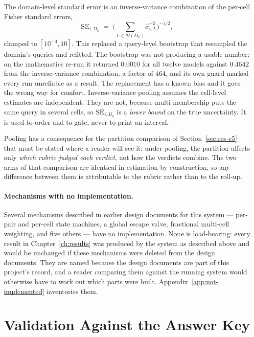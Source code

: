 The domain-level standard error is an inverse-variance combination of
the per-cell Fisher standard errors,
\[
\mathrm{SE}_{i,D_k} \;=\;
\Big(\textstyle\sum_{L \in \mathcal{D}(D_k)} \hat{\sigma}_{i,L}^{-2}\Big)^{-1/2},
\]
clamped to $[10^{-3}, 10]$. This replaced a query-level bootstrap that
resampled the domain's queries and refitted. The bootstrap was not
producing a usable number: on the mathematics re-run it returned
$0.0010$ for all twelve models against $0.4642$ from the
inverse-variance combination, a factor of $464$, and its own guard
marked every run unreliable as a result.
The replacement has a known bias and it goes the wrong way for comfort.
Inverse-variance pooling assumes the cell-level estimates are
independent. They are not, because multi-membership puts the same query
in several cells, so $\mathrm{SE}_{i,D_k}$ is a \emph{lower bound} on
the true uncertainty. It is used to order and to gate, never to print
an interval.

Pooling has a consequence for the partition comparison of
Section~\ref{sec:res-c5} that must be stated where a reader will see
it: under pooling, the partition affects only \emph{which rubric judged
each verdict}, not how the verdicts combine. The two arms of that
comparison are identical in estimation by construction, so any
difference between them is attributable to the rubric rather than to
the roll-up.

\paragraph{Mechanisms with no implementation.}\label{sec:meth-not-implemented}
Several mechanisms described in earlier design documents for this
system --- per-pair and per-cell state machines, a global escape valve,
fractional multi-cell weighting, and five others --- have no
implementation. None is load-bearing: every result in
Chapter~\ref{ch:results} was produced by the system as described above
and would be unchanged if these mechanisms were deleted from the design
documents. They are named because the design documents are part of this
project's record, and a reader comparing them against the running
system would otherwise have to work out which parts were built.
Appendix~\ref{app:not-implemented} inventories them.

\section{Validation Against the Answer Key}\label{sec:meth-validation}

